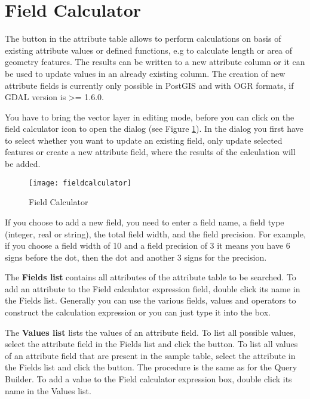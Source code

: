 \section{Field Calculator}\label{sec:field_calculator}

The  button in the
attribute table allows to perform calculations on basis of existing
attribute values or defined functions, e.g to calculate length or area
of geometry features. The results can be written to a new attribute column
or it can be used to update values in an already existing column. The creation
of new attribute fields is currently only possible in PostGIS and with OGR
formats, if GDAL version is >= 1.6.0.

You have to bring the vector layer in editing mode, before you can click on
the field calculator icon to open the dialog (see Figure
\ref{fig:field_calculator}). In the dialog you first have to select whether
you want to update an existing field, only update selected features or
create a new attribute field, where the results of the calculation will be added.

\begin{figure}[ht]
  \centering
    \texttt{[image: fieldcalculator]}
    \caption{Field Calculator \nixcaption}\label{fig:field_calculator}
\end{figure}

If you choose to add a new field, you need to enter a field name, a field type
(integer, real or string), the total field width, and the field precision.
For example, if you choose a field width of 10 and a field precision of 3 it
means you have 6 signs before the dot, then the dot and another 3 signs for the
precision.

The \textbf{Fields list} contains all attributes of the attribute table to be
searched. To add an attribute to the Field calculator expression field, double
click its name in the Fields list. Generally you can use the various fields,
values and operators to construct the calculation expression or you can just
type it into the box.

The \textbf{Values list} lists the values of an attribute field. To list all
possible values, select the attribute field in the Fields list and click the
 button. To list all
values of an attribute field that are present in the sample table, select the
attribute in the Fields list and click the  button. The procedure is the same as for the Query
Builder. To add a value to the Field calculator expression box, double click its
name in the Values list.

